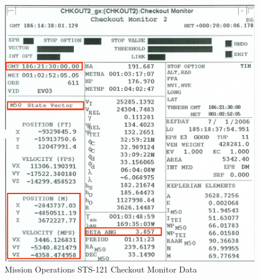 \begin{figure}
\centering
\includegraphics{figures/SOLAR_BETA_fig7}
\caption{Mission Operations STS-121 Checkout Monitor Data}
\label{fig:STS_121b}
\end{figure}

\clearpage
